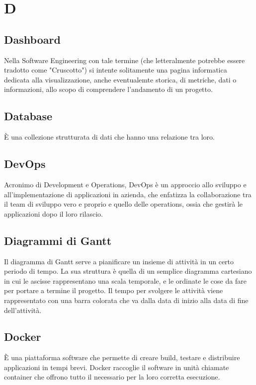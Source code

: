 \section*{D}

\subsection{Dashboard}
Nella Software Engineering con tale termine (che letteralmente potrebbe essere tradotto come "Cruscotto") si intente solitamente una pagina  informatica dedicata alla visualizzazione, anche eventualemte storica, di metriche, dati o informazioni, allo scopo di comprendere l'andamento di un progetto.

\subsection{Database}
È una collezione strutturata di dati che hanno una relazione tra loro.

\subsection{DevOps}
Acronimo di Development e Operations, DevOps è un approccio allo sviluppo e all’implementazione di applicazioni in azienda, che enfatizza la collaborazione tra il team di sviluppo vero e proprio e quello delle operations, ossia che gestirà le applicazioni dopo il loro rilascio.

\subsection{Diagrammi di Gantt}
Il diagramma di Gantt serve a pianificare un insieme di attività in un certo periodo di tempo. La sua struttura è quella di un semplice diagramma cartesiano in cui le ascisse rappresentano una scala temporale, e le ordinate le cose da fare per portare a termine il progetto. Il tempo per svolgere le attività viene rappresentato con una barra colorata che va dalla data di inizio alla data di fine dell'attività.

\subsection{Docker}
È una piattaforma software che permette di creare build, testare e distribuire applicazioni in tempi brevi. Docker raccoglie il software in unità chiamate container che offrono tutto il necessario per la loro corretta esecuzione.

